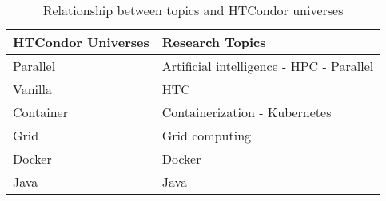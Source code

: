 \begin{table}[htbp]
	\centering
	\caption{Relationship between topics and HTCondor universes}
	\label{table:topics_universes}
	\renewcommand{\arraystretch}{1}  %
	\begin{tabular}{p{2.8cm}p{4.5cm}}
		\toprule
		\textbf{HTCondor Universes} & \textbf{Research Topics}                 \\
		\midrule
		Parallel                    & Artificial intelligence - HPC - Parallel \\
		\addlinespace[0.8em]
		Vanilla                     & HTC                                      \\
		\addlinespace[0.8em]
		Container                   & Containerization - Kubernetes            \\
		\addlinespace[0.8em]
		Grid                        & Grid computing                           \\
		\addlinespace[0.8em]
		Docker                      & Docker                                   \\
		\addlinespace[0.8em]
		Java                        & Java                                     \\
		\bottomrule
	\end{tabular}
\end{table}
